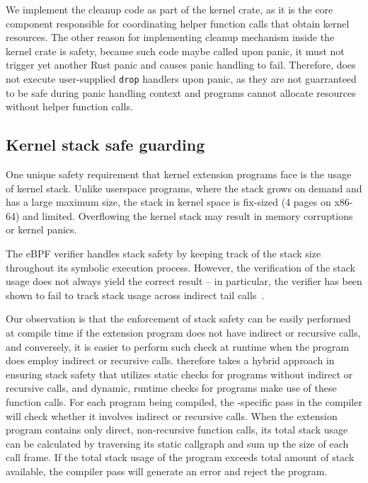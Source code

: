 We implement the cleanup code as part of the \projname{} kernel crate, as it
    is the core component responsible for coordinating helper function calls
    that obtain kernel resources.
The other reason for implementing cleanup mechanism inside the kernel crate is
    safety, because such code maybe called upon panic, it must not trigger yet
    another Rust panic and causes panic handling to fail.
Therefore, \projname{} does not execute user-supplied \texttt{drop} handlers
    upon panic, as they are not guarranteed to be safe during panic handling
    context and programs cannot allocate resources without helper function
    calls.

\subsection{Kernel stack safe guarding}
\label{principle:stack}
One unique safety requirement that kernel extension programs face is the
    usage of kernel stack.
Unlike userspace programs, where the stack grows on demand and has a large
    maximum size,
    the stack in kernel space is fix-sized (4 pages on x86-64) and limited.
Overflowing the kernel stack may result in memory corruptions or kernel panics.

The eBPF verifier handles stack safety by keeping track of the stack size
    throughout its symbolic execution process.
However, the verification of the stack usage does not always yield the correct
    result -- in particular, the verifier has been shown to fail to track stack
    usage across indirect tail calls~\cite{ebpf-stackoverflow}.

Our observation is that the enforcement of stack safety can be easily performed
    at compile time if the extension program does not have indirect or
    recursive calls, and conversely, it is easier to perform such check at
    runtime when the program does employ indirect or recursive calls.
\projname{} therefore takes a hybrid approach in ensuring stack safety that
    utilizes static checks for programs without indirect or recursive calls,
    and dynamic, runtime checks for programs make use of these function calls.
For each program being compiled, the \projname{}-specific pass in the compiler
    will check whether it involves indirect or recursive calls.
When the extension program contains only direct, non-recursive function calls,
    its total stack usage can be calculated by traversing its static callgraph
    and sum up the size of each call frame.
If the total stack usage of the program exceeds total amount of stack
    available, the \projname{} compiler pass will generate an error and reject
    the program.

